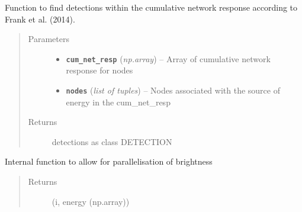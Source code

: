 \documentclass[a4paper,10pt,english]{sphinxmanual}
\begin{document}
\begin{fulllineitems}
\label{core:bright_lights._find_detections}
Function to find detections within the cumulative network response according
to Frank et al. (2014).
\begin{quote}\begin{description}
\item[{Parameters}] \leavevmode\begin{itemize}
\item {} 
\textbf{\texttt{cum\_net\_resp}} (\emph{np.array}) -- Array of cumulative network response for nodes

\item {} 
\textbf{\texttt{nodes}} (\emph{list of tuples}) -- Nodes associated with the source of energy in the cum\_net\_resp

\end{itemize}

\item[{Returns}] \leavevmode
detections as class DETECTION

\end{description}\end{quote}

\end{fulllineitems}


\begin{fulllineitems}
\label{core:bright_lights._node_loop}
Internal function to allow for parallelisation of brightness
\begin{quote}\begin{description}
\item[{Returns}] \leavevmode
(i, energy (np.array))

\end{description}\end{quote}

\end{fulllineitems}

\end{document}
